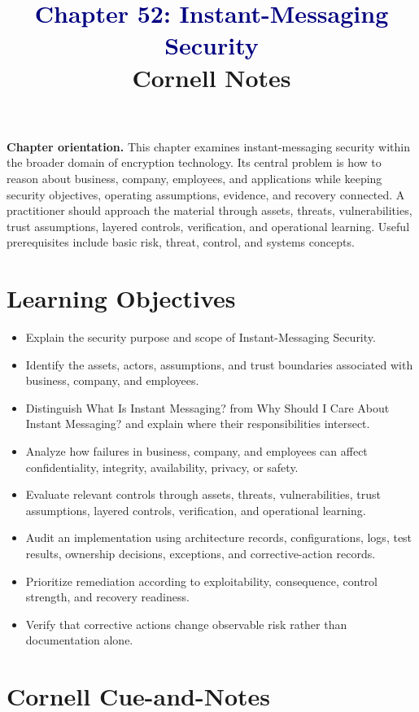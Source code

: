 \documentclass[11pt]{article}
\title{\textcolor{Navy}{Chapter 52: Instant-Messaging Security}\\[2mm]\large Cornell Notes}
\author{}
\date{}
\begin{document}
\maketitle
\thispagestyle{fancy}
\vspace{-1.5em}
\begin{orientationbox}
\textbf{Chapter orientation.} This chapter examines instant-messaging security within the broader domain of encryption technology. Its central problem is how to reason about business, company, employees, and applications while keeping security objectives, operating assumptions, evidence, and recovery connected. A practitioner should approach the material through assets, threats, vulnerabilities, trust assumptions, layered controls, verification, and operational learning. Useful prerequisites include basic risk, threat, control, and systems concepts.
\end{orientationbox}
\section*{Learning Objectives}
\begin{itemize}
\item Explain the security purpose and scope of Instant-Messaging Security.
\item Identify the assets, actors, assumptions, and trust boundaries associated with business, company, and employees.
\item Distinguish What Is Instant Messaging? from Why Should I Care About Instant Messaging? and explain where their responsibilities intersect.
\item Analyze how failures in business, company, and employees can affect confidentiality, integrity, availability, privacy, or safety.
\item Evaluate relevant controls through assets, threats, vulnerabilities, trust assumptions, layered controls, verification, and operational learning.
\item Audit an implementation using architecture records, configurations, logs, test results, ownership decisions, exceptions, and corrective-action records.
\item Prioritize remediation according to exploitability, consequence, control strength, and recovery readiness.
\item Verify that corrective actions change observable risk rather than documentation alone.
\end{itemize}
\section*{Cornell Cue-and-Notes}
\end{document}
